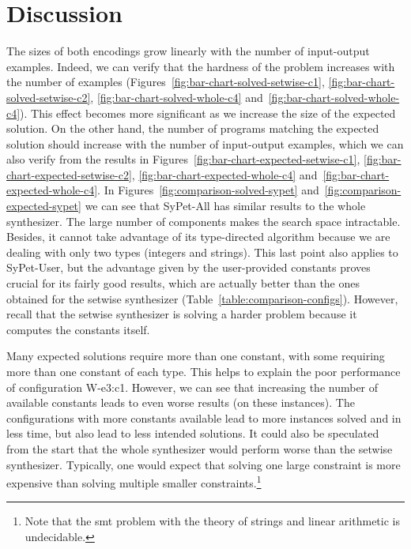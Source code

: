 \section{Discussion}
\label{sec:discussion}

The sizes of both encodings grow linearly with the number of input-output
examples. Indeed, we can verify that the hardness of the problem increases with
the number of examples (Figures~\ref{fig:bar-chart-solved-setwise-c1},
\ref{fig:bar-chart-solved-setwise-c2}, \ref{fig:bar-chart-solved-whole-c4}
and~\ref{fig:bar-chart-solved-whole-c4}).
This effect becomes more significant as we increase the size of the expected
solution.
On the other hand, the number of programs matching the expected solution should
increase with the number of input-output examples, which we can also verify from
the results in Figures~\ref{fig:bar-chart-expected-setwise-c1},
\ref{fig:bar-chart-expected-setwise-c2}, \ref{fig:bar-chart-expected-whole-c4}
and~\ref{fig:bar-chart-expected-whole-c4}.
In Figures~\ref{fig:comparison-solved-sypet}
and~\ref{fig:comparison-expected-sypet} we can see that SyPet-All has similar
results to the whole synthesizer.
The large number of components makes the search space intractable.
Besides, it cannot take advantage of its type-directed algorithm because we are
dealing with only two types (integers and strings).
This last point also applies to SyPet-User, but the advantage given by the
user-provided constants proves crucial for its fairly good results, which are
actually better than the ones obtained for the setwise synthesizer
(Table~\ref{table:comparison-configs}).
However, recall that the setwise synthesizer is solving a harder problem because
it computes the constants itself.

Many expected solutions require more than one constant, with some requiring more
than one constant of each type.
This helps to explain the poor performance of configuration W-e3:c1.
However, we can see that increasing the number of available constants leads to
even worse results (on these instances).
The configurations with more constants available lead to more instances solved
and in less time, but also lead to less intended solutions.
It could also be speculated from the start that the whole synthesizer would
perform worse than the setwise synthesizer.
Typically, one would expect that solving one large constraint is more expensive
than solving multiple smaller constraints.\footnote{Note that the \gls{smt}
problem with the theory of strings and linear arithmetic is undecidable.}

